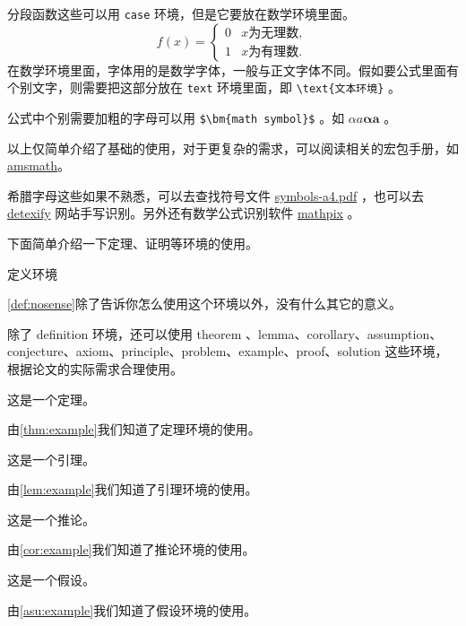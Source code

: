 \documentclass[withoutpreface,bwprint]{cumcmthesis} %
\numberwithin{equation}{subsection}
\begin{document}
分段函数这些可以用 \verb|case| 环境，但是它要放在数学环境里面。
\[
f(x) =
    \begin{cases}
        0 &  x \text{为无理数} ,\\
        1 &  x \text{为有理数} .
    \end{cases}
\]
在数学环境里面，字体用的是数学字体，一般与正文字体不同。假如要公式里面有个别文字，则需要把这部分放在 \verb|text| 环境里面，即 \verb|\text{文本环境}| 。

公式中个别需要加粗的字母可以用 \verb|$\bm{math symbol}$| 。如 $ \alpha a\bm{\alpha a} $ 。

以上仅简单介绍了基础的使用，对于更复杂的需求，可以阅读相关的宏包手册，如 \href{http://texdoc.net/texmf-dist/doc/latex/amsmath/amsldoc.pdf}{amsmath}。

希腊字母这些如果不熟悉，可以去查找符号文件 \href{http://mirrors.ctan.org/info/symbols/comprehensive/symbols-a4.pdf}{symbols-a4.pdf} ，也可以去 \href{http://detexify.kirelabs.org/classify.html}{detexify} 网站手写识别。另外还有数学公式识别软件 \href{https://mathpix.com/}{mathpix} 。

下面简单介绍一下定理、证明等环境的使用。
\begin{definition}
    定义环境
    \label{def:nosense}
\end{definition}
\cref{def:nosense}除了告诉你怎么使用这个环境以外，没有什么其它的意义。

除了 definition 环境，还可以使用 theorem 、lemma、corollary、assumption、conjecture、axiom、principle、problem、example、proof、solution 这些环境，根据论文的实际需求合理使用。

\begin{theorem}
    这是一个定理。
    \label{thm:example}
\end{theorem}
由\cref{thm:example}我们知道了定理环境的使用。

\begin{lemma}
    这是一个引理。
    \label{lem:example}
\end{lemma}
由\cref{lem:example}我们知道了引理环境的使用。

\begin{corollary}
    这是一个推论。
    \label{cor:example}
\end{corollary}
由\cref{cor:example}我们知道了推论环境的使用。

\begin{assumption}
    这是一个假设。
    \label{asu:example}
\end{assumption}
由\cref{asu:example}我们知道了假设环境的使用。
\end{document}
